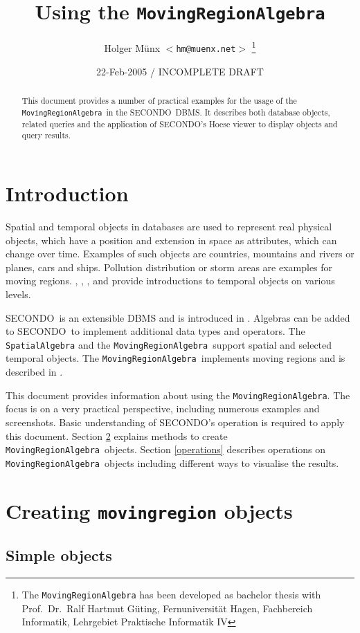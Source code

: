 \documentclass[a4paper,12pt]{article}
\title{Using the {\tt MovingRegionAlgebra}}
\author{Holger M\"{u}nx {\tt $<$hm@muenx.net$>$}
    \thanks{The {\tt MovingRegionAlgebra} has been developed
    as bachelor thesis with Prof.\ Dr.\ Ralf Hartmut G\"{u}ting,
    Fernuniversit\"{a}t Hagen, Fachbereich Informatik, 
    Lehrgebiet Praktische Informatik IV}}
\date{22-Feb-2005 / INCOMPLETE DRAFT}
\newcommand{\secondo}{{\scshape SE\-CON\-DO}}
\newcommand{\mra}{{\tt MovingRegionAlgebra}}
\begin{document}
\maketitle

\begin{abstract}
This document provides a number of practical examples for the usage
of the \mra\ in the \secondo\ DBMS. It describes
both database objects, related queries and the application of
\secondo's Hoese viewer to display objects and query results.
\end{abstract}

\section{Introduction}

Spatial and temporal objects in databases are used to represent
real physical objects, which have a position and extension in space
as attributes, which can change over time. Examples of such objects
are countries, mountains and rivers or planes, cars and ships.
Pollution distribution or storm areas are examples for moving
regions. \cite{GuS04}, \cite{EGS+99}, \cite{GBE+00}, \cite{FGN+00}
and \cite{LFG03}
provide introductions to temporal objects on various levels.

\secondo\ is an extensible DBMS and is introduced in \cite{DiG99}.
Algebras can be added to \secondo\ to implement additional data types
and operators. The {\tt SpatialAlgebra}
and the \mra\ support spatial and selected temporal
objects. The \mra\ implements moving regions and
is described in \cite{Mue05}.

This document provides information about using the \mra. The
focus is on a very practical perspective, including numerous examples
and screenshots. Basic understanding of \secondo's operation is required
to apply this document.
Section \ref{creating} explains methods to create
\mra\ objects. Section \ref{operations} describes operations on
\mra\ objects including different ways to visualise the results.

\section{Creating {\tt movingregion} objects}
\label{creating}

\subsection{Simple objects}
\end{document}
